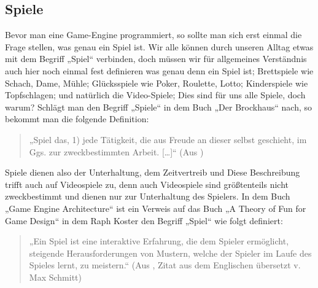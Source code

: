 \subsection{Spiele}	

Bevor man eine Game-Engine programmiert, so sollte man sich erst einmal die Frage stellen, was genau ein Spiel ist. Wir alle können durch unseren Alltag etwas mit dem Begriff „Spiel“ verbinden, doch müssen wir für allgemeines Verständnis auch hier noch einmal fest definieren was genau denn ein Spiel ist;
Brettspiele wie Schach, Dame, Mühle; Glücksspiele wie Poker, Roulette, Lotto; Kinderspiele wie Topfschlagen; und natürlich die Video-Spiele; Dies sind für uns alle Spiele, doch warum?
Schlägt man den Begriff „Spiele“ in dem Buch „Der Brockhaus“ nach, so bekommt man die folgende Definition:

\begin{quote}
	„Spiel das, 1) jede Tätigkeit, die aus Freude an dieser selbst geschieht, im Ggs. zur zweckbestimmten Arbeit. […]“ (Aus \cite{brockhaus})
\end{quote}

Spiele dienen also der Unterhaltung, dem Zeitvertreib und 
Diese Beschreibung trifft auch auf Videospiele zu, denn auch Videospiele sind größtenteils nicht zweckbestimmt und dienen nur zur Unterhaltung des Spielers.
In dem Buch „Game Engine Architecture“ \cite{gea} ist ein Verweis auf das Buch „A Theory
of Fun for Game Design“ in dem Raph Koster den Begriff „Spiel“ wie folgt definiert:

\begin{quote}
	„Ein Spiel ist eine interaktive Erfahrung, die dem Spieler ermöglicht, steigende Herausforderungen von Mustern, welche der Spieler im Laufe des Spieles lernt, zu meistern.“
	(Aus \cite{theoryoffun}, Zitat aus dem Englischen übersetzt v. Max Schmitt)
\end{quote}
